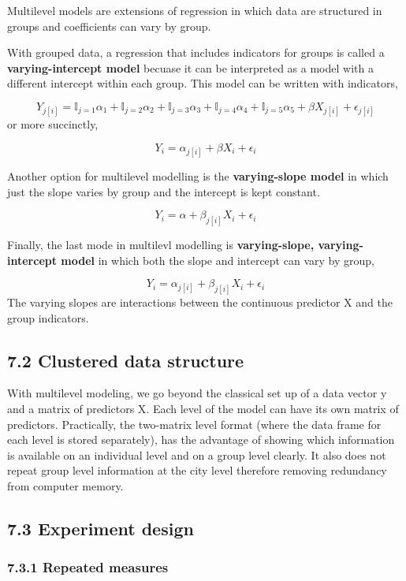 \documentclass[12pt,]{article}
\begin{document}
Multilevel models are extensions of regression in which data are
structured in groups and coefficients can vary by group.

With grouped data, a regression that includes indicators for groups is
called a \textbf{varying-intercept model} becuase it can be interpreted
as a model with a different intercept within each group. This model can
be written with indicators,

\[
Y_{j[i]} = \mathbb{I}_{j = 1}\alpha_1 + \mathbb{I}_{j = 2}\alpha_2 + \mathbb{I}_{j = 3}\alpha_3 + \mathbb{I}_{j = 4}\alpha_4 + \mathbb{I}_{j = 5}\alpha_5 +\beta X_{j[i]} + \epsilon_{j[i]}
\] or more succinctly,

\[
Y_{i} = \alpha_{j[i]} + \beta X_{i} + \epsilon_{i}
\]

Another option for multilevel modelling is the \textbf{varying-slope
model} in which just the slope varies by group and the intercept is kept
constant.

\[
Y_{i} = \alpha + \beta_{j[i]} X_{i} + \epsilon_{i}
\]

Finally, the last mode in multilevl modelling is \textbf{varying-slope,
varying-intercept model} in which both the slope and intercept can vary
by group,

\[
Y_i = \alpha_{j[i]} + \beta_{j[i]}X_i + \epsilon_i
\] The varying slopes are interactions between the continuous predictor
X and the group indicators.

\subsection{7.2 Clustered data
structure}\label{clustered-data-structure}

With multilevel modeling, we go beyond the classical set up of a data
vector y and a matrix of predictors X. Each level of the model can have
its own matrix of predictors. Practically, the two-matrix level format
(where the data frame for each level is stored separately), has the
advantage of showing which information is available on an individual
level and on a group level clearly. It also does not repeat group level
information at the city level therefore removing redundancy from
computer memory.

\subsection{7.3 Experiment design}\label{experiment-design}

\subsubsection{7.3.1 Repeated measures}\label{repeated-measures}
\end{document}
